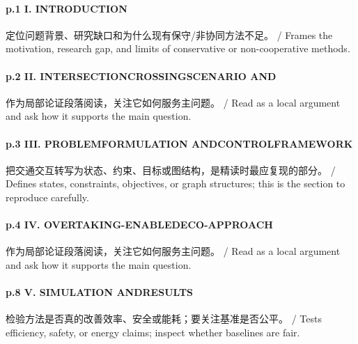 \documentclass[UTF8,a4paper,11pt,fontset=fandol]{ctexart}
\begin{document}
\paragraph{p.1 I. INTRODUCTION}定位问题背景、研究缺口和为什么现有保守/非协同方法不足。 / Frames the motivation, research gap, and limits of conservative or non-cooperative methods.

\paragraph{p.2 II. INTERSECTIONCROSSINGSCENARIO AND}作为局部论证段落阅读，关注它如何服务主问题。 / Read as a local argument and ask how it supports the main question.

\paragraph{p.3 III. PROBLEMFORMULATION ANDCONTROLFRAMEWORK}把交通交互转写为状态、约束、目标或图结构，是精读时最应复现的部分。 / Defines states, constraints, objectives, or graph structures; this is the section to reproduce carefully.

\paragraph{p.4 IV. OVERTAKING-ENABLEDECO-APPROACH}作为局部论证段落阅读，关注它如何服务主问题。 / Read as a local argument and ask how it supports the main question.

\paragraph{p.8 V. SIMULATION ANDRESULTS}检验方法是否真的改善效率、安全或能耗；要关注基准是否公平。 / Tests efficiency, safety, or energy claims; inspect whether baselines are fair.
\end{document}
